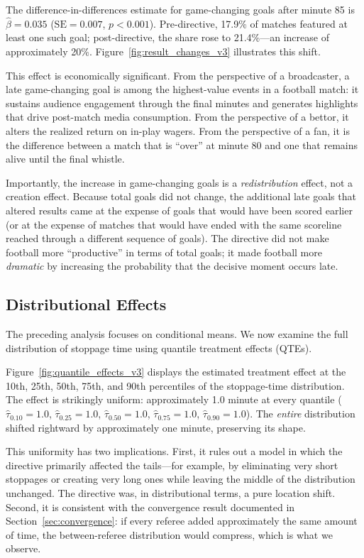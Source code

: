 The difference-in-differences estimate for game-changing goals after minute 85 is $\hat{\beta} = 0.035$ ($\text{SE} = 0.007$, $p < 0.001$).  Pre-directive, 17.9\% of matches featured at least one such goal; post-directive, the share rose to 21.4\%---an increase of approximately 20\%.  Figure~\ref{fig:result_changes_v3} illustrates this shift.

This effect is economically significant.  From the perspective of a broadcaster, a late game-changing goal is among the highest-value events in a football match: it sustains audience engagement through the final minutes and generates highlights that drive post-match media consumption.  From the perspective of a bettor, it alters the realized return on in-play wagers.  From the perspective of a fan, it is the difference between a match that is ``over'' at minute 80 and one that remains alive until the final whistle.

Importantly, the increase in game-changing goals is a \emph{redistribution} effect, not a creation effect.  Because total goals did not change, the additional late goals that altered results came at the expense of goals that would have been scored earlier (or at the expense of matches that would have ended with the same scoreline reached through a different sequence of goals).  The directive did not make football more ``productive'' in terms of total goals; it made football more \emph{dramatic} by increasing the probability that the decisive moment occurs late.

\subsection{Distributional Effects}
\label{sec:distributional}

The preceding analysis focuses on conditional means.  We now examine the full distribution of stoppage time using quantile treatment effects (QTEs).

Figure~\ref{fig:quantile_effects_v3} displays the estimated treatment effect at the 10th, 25th, 50th, 75th, and 90th percentiles of the stoppage-time distribution.  The effect is strikingly uniform: approximately 1.0 minute at every quantile ($\hat{\tau}_{0.10} = 1.0$, $\hat{\tau}_{0.25} = 1.0$, $\hat{\tau}_{0.50} = 1.0$, $\hat{\tau}_{0.75} = 1.0$, $\hat{\tau}_{0.90} = 1.0$).  The \emph{entire} distribution shifted rightward by approximately one minute, preserving its shape.

This uniformity has two implications.  First, it rules out a model in which the directive primarily affected the tails---for example, by eliminating very short stoppages or creating very long ones while leaving the middle of the distribution unchanged.  The directive was, in distributional terms, a pure location shift.  Second, it is consistent with the convergence result documented in Section~\ref{sec:convergence}: if every referee added approximately the same amount of time, the between-referee distribution would compress, which is what we observe.

